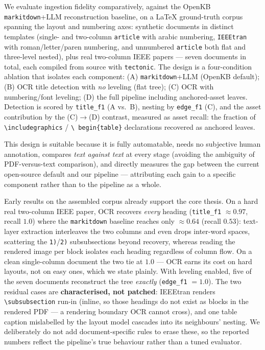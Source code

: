 \documentclass[11pt, a4paper]{article}
\begin{document}
We evaluate ingestion fidelity comparatively, against the OpenKB
\texttt{markitdown}+LLM reconstruction baseline, on a LaTeX ground-truth
corpus spanning the layout and numbering axes: synthetic documents in
distinct templates (single- and two-column \texttt{article} with arabic
numbering, \texttt{IEEEtran} with roman/letter/paren numbering, and
unnumbered \texttt{article} both flat and three-level nested), plus real
two-column IEEE papers --- seven documents in total, each compiled from
source with \texttt{tectonic}. The design is a four-condition ablation
that isolates each component: (A) \texttt{markitdown}+LLM (OpenKB
default); (B) OCR title detection with \emph{no} leveling (flat tree);
(C) OCR with numbering/font leveling; (D) the full pipeline including
anchored-asset leaves. Detection is scored by \texttt{title\_f1}
(A vs.\ B), nesting by \texttt{edge\_f1} (C), and the asset contribution
by the (C)$\to$(D) contrast, measured as asset recall: the fraction of
\texttt{\textbackslash includegraphics} / \texttt{\textbackslash
begin\{table\}} declarations recovered as anchored leaves.

This design is suitable because it is fully automatable, needs no
subjective human annotation, compares \emph{text against text} at every
stage (avoiding the ambiguity of PDF-versus-text comparison), and
directly measures the gap between the current open-source default and our
pipeline --- attributing each gain to a specific component rather than to
the pipeline as a whole.

Early results on the assembled corpus already support the core thesis.
On a hard real two-column IEEE paper, OCR recovers \emph{every} heading
(\texttt{title\_f1} $\approx 0.97$, recall $1.0$) where the
\texttt{markitdown} baseline reaches only $\approx 0.64$ (recall $0.53$):
text-layer extraction interleaves the two columns and even drops
inter-word spaces, scattering the \texttt{1)}/\texttt{2)} subsubsections
beyond recovery, whereas reading the rendered image per block isolates
each heading regardless of column flow. On a clean single-column document
the two tie at $1.0$ --- OCR earns its cost on hard layouts, not on easy
ones, which we state plainly. With leveling enabled, five of the seven
documents reconstruct the tree \emph{exactly} (\texttt{edge\_f1} $= 1.0$).
The two residual cases are \textbf{characterised, not patched}: IEEEtran
renders \texttt{\textbackslash subsubsection} run-in (inline, so those
headings do not exist as blocks in the rendered PDF --- a rendering
boundary OCR cannot cross), and one table caption mislabelled by the
layout model cascades into its neighbours' nesting. We deliberately do
not add document-specific rules to erase these, so the reported numbers
reflect the pipeline's true behaviour rather than a tuned evaluator.



\printbibliography
\end{document}
